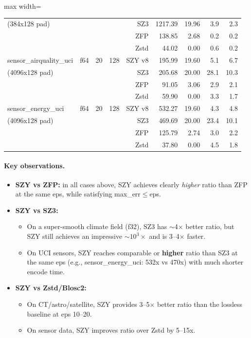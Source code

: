 \documentclass[11pt,a4paper]{article}
\begin{document}
\begin{table}[H]
\begin{adjustbox}{max width=\textwidth}
\begin{tabular}{@{}llrrrrrrr@{}}
(384x128 pad)             &     &    &     & SZ3    &1217.39 &19.96 & 3.9 & 2.3 \\
                          &     &    &     & ZFP    &138.85 & 2.68 & 0.2 & 0.2 \\
                          &     &    &     & Zstd   & 44.02 & 0.00 & 0.6 & 0.2 \\
\midrule
sensor\_airquality\_uci & f64 & 20 & 128 & SZY v8 &195.99 &19.60 & 5.1 & 6.7 \\
(4096x128 pad)          &     &    &     & SZ3    &205.68 &20.00 &28.1 &10.3 \\
                        &     &    &     & ZFP    &91.05 & 3.06 & 2.9 & 2.1 \\
                        &     &    &     & Zstd   &59.90 & 0.00 & 3.3 & 1.7 \\
\midrule
sensor\_energy\_uci & f64 & 20 & 128 & SZY v8 &532.27 &19.60 & 4.3 & 4.8 \\
(4096x128 pad)      &     &    &     & SZ3    &469.69 &20.00 &23.4 &10.1 \\
                    &     &    &     & ZFP    &125.79 & 2.74 & 3.0 & 2.2 \\
                    &     &    &     & Zstd   &37.80 & 0.00 & 4.5 & 1.8 \\
\bottomrule
\end{tabular}
\end{adjustbox}
\end{table}

\paragraph{Key observations.}
\begin{itemize}
  \item \textbf{SZY vs ZFP:} in all cases above, SZY achieves clearly \emph{higher} ratio than ZFP at the same eps, while satisfying max\_err$\le$eps.
  \item \textbf{SZY vs SZ3:}
        \begin{itemize}
          \item On a super-smooth climate field (f32), SZ3 has $\sim$4$\times$ better ratio, but SZY still achieves an impressive $\sim 10^3\times$ and is 3--4$\times$ faster.
          \item On UCI sensors, SZY reaches comparable or \textbf{higher} ratio than SZ3 at the same eps (e.g., sensor\_energy\_uci: 532x vs 470x) with much shorter encode time.
        \end{itemize}
  \item \textbf{SZY vs Zstd/Blosc2:}
        \begin{itemize}
          \item On CT/astro/satellite, SZY provides 3--5$\times$ better ratio than the lossless baseline at eps 10--20.
          \item On sensor data, SZY improves ratio over Zstd by 5--15x.
        \end{itemize}
\end{itemize}
\end{document}
